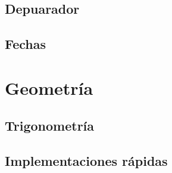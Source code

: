 \subsection{Depuarador}


\subsection{Fechas}

\section{Geometría}

\subsection{Trigonometría}

\subsection{Implementaciones rápidas}



